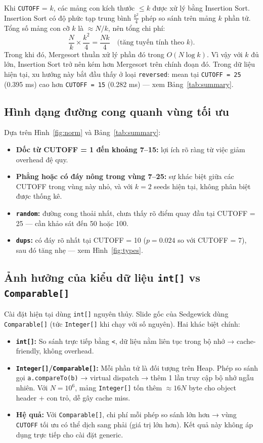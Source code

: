 \documentclass[12pt, a4paper]{article}
\begin{document}
Khi \texttt{CUTOFF} = $k$, các mảng con kích thước $\leq k$ được xử lý bằng Insertion
Sort. Insertion Sort có độ phức tạp trung bình $\frac{k^2}{4}$ phép so sánh trên mảng
$k$ phần tử. Tổng số mảng con cỡ $k$ là $\approx N/k$, nên tổng chi phí:
\[
    \frac{N}{k} \times \frac{k^2}{4} = \frac{Nk}{4} \quad
    \bigg(\text{tăng tuyến tính theo } k\bigg).
\]
Trong khi đó, Mergesort thuần xử lý phần đó trong $O(N \log k)$. Vì vậy với $k$ đủ
lớn, Insertion Sort trở nên kém hơn Mergesort trên chính đoạn đó. Trong dữ liệu hiện
tại, xu hướng này bắt đầu thấy ở loại \texttt{reversed}: mean tại
\texttt{CUTOFF = 25} (0.395 ms) cao hơn \texttt{CUTOFF = 15} (0.282 ms) — xem
Bảng~\ref{tab:summary}.

\subsection{Hình dạng đường cong quanh vùng tối ưu}

Dựa trên Hình~\ref{fig:norm} và Bảng~\ref{tab:summary}:
\begin{itemize}
    \item \textbf{Dốc từ CUTOFF = 1 đến khoảng 7--15:} lợi ích rõ ràng từ việc giảm overhead đệ quy.
    \item \textbf{Phẳng hoặc có đáy nông trong vùng 7--25:} sự khác biệt giữa các CUTOFF trong vùng này nhỏ, và với $k = 2$ seeds hiện tại, không phân biệt được thống kê.
    \item \textbf{\texttt{random}:} đường cong thoải nhất, chưa thấy rõ điểm quay đầu tại CUTOFF = 25 — cần khảo sát đến 50 hoặc 100.
    \item \textbf{\texttt{dups}:} có đáy rõ nhất tại CUTOFF = 10 ($p = 0.024$ so với CUTOFF = 7), sau đó tăng nhẹ — xem Hình~\ref{fig:types}.
\end{itemize}

\subsection{Ảnh hưởng của kiểu dữ liệu \texttt{int[]} vs \texttt{Comparable[]}}

Cài đặt hiện tại dùng \texttt{int[]} nguyên thủy. Slide gốc của Sedgewick dùng
\texttt{Comparable[]} (tức \texttt{Integer[]} khi chạy với số nguyên). Hai khác biệt chính:
\begin{itemize}
    \item \textbf{\texttt{int[]}:} So sánh trực tiếp bằng \texttt{<}, dữ liệu
          nằm liên tục trong bộ nhớ → cache-friendly, không overhead.
    \item \textbf{\texttt{Integer[]}/\texttt{Comparable[]}:} Mỗi phần tử là đối
          tượng trên Heap. Phép so sánh gọi \texttt{a.compareTo(b)} → virtual
          dispatch → thêm 1 lần truy cập bộ nhớ ngẫu nhiên. Với $N = 10^6$,
          mảng \texttt{Integer[]} tốn thêm $\approx 16N$ byte cho object header
          + con trỏ, dễ gây cache miss.
    \item \textbf{Hệ quả:} Với \texttt{Comparable[]}, chi phí mỗi phép so sánh
          lớn hơn → vùng \texttt{CUTOFF} tối ưu có thể dịch sang phải (giá trị
          lớn hơn). Kết quả này không áp dụng trực tiếp cho cài đặt generic.
\end{itemize}
\end{document}
